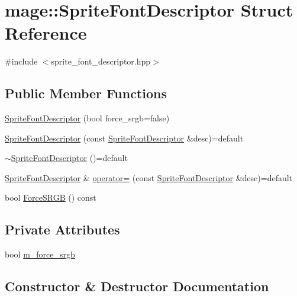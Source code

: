 \hypertarget{structmage_1_1_sprite_font_descriptor}{}\section{mage\+:\+:Sprite\+Font\+Descriptor Struct Reference}
\label{structmage_1_1_sprite_font_descriptor}


{\ttfamily \#include $<$sprite\+\_\+font\+\_\+descriptor.\+hpp$>$}

\subsection*{Public Member Functions}
\begin{DoxyCompactItemize}
\item 
\hyperlink{structmage_1_1_sprite_font_descriptor_a3622392aa130d14690c3cb1553b746bd}{Sprite\+Font\+Descriptor} (bool force\+\_\+srgb=false)
\item 
\hyperlink{structmage_1_1_sprite_font_descriptor_a8a8d4998026895fc55646a8d3538dcaa}{Sprite\+Font\+Descriptor} (const \hyperlink{structmage_1_1_sprite_font_descriptor}{Sprite\+Font\+Descriptor} \&desc)=default
\item 
\hyperlink{structmage_1_1_sprite_font_descriptor_ab259871eed5ca9be3830d7da9cfc7092}{$\sim$\+Sprite\+Font\+Descriptor} ()=default
\item 
\hyperlink{structmage_1_1_sprite_font_descriptor}{Sprite\+Font\+Descriptor} \& \hyperlink{structmage_1_1_sprite_font_descriptor_a2279d65420bd8230a334c4ceb560fcf6}{operator=} (const \hyperlink{structmage_1_1_sprite_font_descriptor}{Sprite\+Font\+Descriptor} \&desc)=default
\item 
bool \hyperlink{structmage_1_1_sprite_font_descriptor_a255defd4a4d706c37a755c0144c2a927}{Force\+S\+R\+GB} () const
\end{DoxyCompactItemize}
\subsection*{Private Attributes}
\begin{DoxyCompactItemize}
\item 
bool \hyperlink{structmage_1_1_sprite_font_descriptor_a7fa7230004e671127856e2ab1c27c94a}{m\+\_\+force\+\_\+srgb}
\end{DoxyCompactItemize}


\subsection{Constructor \& Destructor Documentation}
\hypertarget{structmage_1_1_sprite_font_descriptor_a3622392aa130d14690c3cb1553b746bd}{}\label{structmage_1_1_sprite_font_descriptor_a3622392aa130d14690c3cb1553b746bd} 
